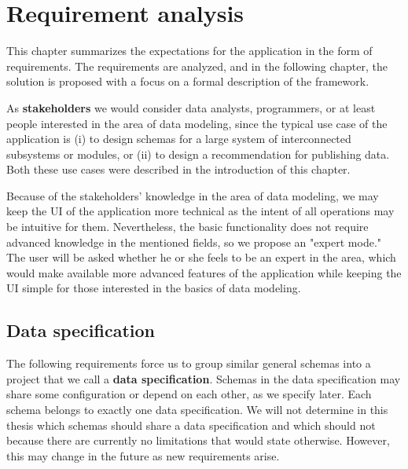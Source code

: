 \chapter{Requirement analysis}\label{chapters:analysis}

This chapter summarizes the expectations for the application in the form of requirements. The requirements are analyzed, and in the following chapter, the solution is proposed with a focus on a formal description of the framework.

\bigskip

As \textbf{stakeholders} we would consider data analysts, programmers, or at least people interested in the area of data modeling, since the typical use case of the application is (i) to design schemas for a large system of interconnected subsystems or modules, or (ii) to design a recommendation for publishing data. Both these use cases were described in the introduction of this chapter.

Because of the stakeholders' knowledge in the area of data modeling, we may keep the UI of the application more technical as the intent of all operations may be intuitive for them. Nevertheless, the basic functionality does not require advanced knowledge in the mentioned fields, so we propose an "expert mode." The user will be asked whether he or she feels to be an expert in the area, which would make available more advanced features of the application while keeping the UI simple for those interested in the basics of data modeling.

\bigskip






\bigskip





\section{Data specification}

The following requirements force us to group similar general schemas into a project that we call a \textbf{data specification}. Schemas in the data specification may share some configuration or depend on each other, as we specify later. Each schema belongs to exactly one data specification. We will not determine in this thesis which schemas should share a data specification and which should not because there are currently no limitations that would state otherwise. However, this may change in the future as new requirements arise.

